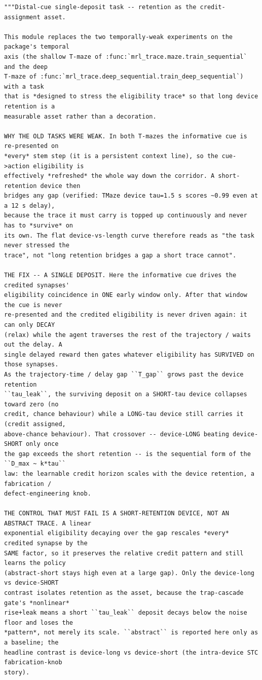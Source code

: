 \begin{lstlisting}[caption={mrl\_trace/distal\_cue.py},label={lst:siox-src-distal_cue}]
"""Distal-cue single-deposit task -- retention as the credit-assignment asset.

This module replaces the two temporally-weak experiments on the package's temporal
axis (the shallow T-maze of :func:`mrl_trace.maze.train_sequential` and the deep
T-maze of :func:`mrl_trace.deep_sequential.train_deep_sequential`) with a task
that is *designed to stress the eligibility trace* so that long device retention is a
measurable asset rather than a decoration.

WHY THE OLD TASKS WERE WEAK. In both T-mazes the informative cue is re-presented on
*every* stem step (it is a persistent context line), so the cue->action eligibility is
effectively *refreshed* the whole way down the corridor. A short-retention device then
bridges any gap (verified: TMaze device tau=1.5 s scores ~0.99 even at a 12 s delay),
because the trace it must carry is topped up continuously and never has to *survive* on
its own. The flat device-vs-length curve therefore reads as "the task never stressed the
trace", not "long retention bridges a gap a short trace cannot".

THE FIX -- A SINGLE DEPOSIT. Here the informative cue drives the credited synapses'
eligibility coincidence in ONE early window only. After that window the cue is never
re-presented and the credited eligibility is never driven again: it can only DECAY
(relax) while the agent traverses the rest of the trajectory / waits out the delay. A
single delayed reward then gates whatever eligibility has SURVIVED on those synapses.
As the trajectory-time / delay gap ``T_gap`` grows past the device retention
``tau_leak``, the surviving deposit on a SHORT-tau device collapses toward zero (no
credit, chance behaviour) while a LONG-tau device still carries it (credit assigned,
above-chance behaviour). That crossover -- device-LONG beating device-SHORT only once
the gap exceeds the short retention -- is the sequential form of the ``D_max ~ k*tau``
law: the learnable credit horizon scales with the device retention, a fabrication /
defect-engineering knob.

THE CONTROL THAT MUST FAIL IS A SHORT-RETENTION DEVICE, NOT AN ABSTRACT TRACE. A linear
exponential eligibility decaying over the gap rescales *every* credited synapse by the
SAME factor, so it preserves the relative credit pattern and still learns the policy
(abstract-short stays high even at a large gap). Only the device-long vs device-SHORT
contrast isolates retention as the asset, because the trap-cascade gate's *nonlinear*
rise+leak means a short ``tau_leak`` deposit decays below the noise floor and loses the
*pattern*, not merely its scale. ``abstract`` is reported here only as a baseline; the
headline contrast is device-long vs device-short (the intra-device STC fabrication-knob
story).


\end{lstlisting}
